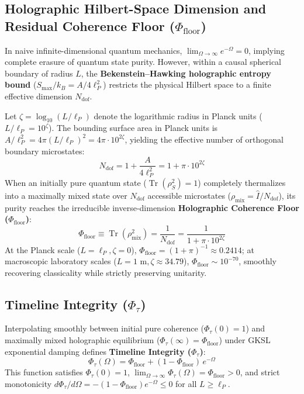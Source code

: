 \documentclass[11pt,a4paper]{article}
\begin{document}
\subsection{Holographic Hilbert-Space Dimension and Residual Coherence Floor ($\Phi_{\mathrm{floor}}$)}
In naive infinite-dimensional quantum mechanics, $\lim_{\Omega \to \infty} e^{-\Omega} = 0$, implying complete erasure of quantum state purity. However, within a causal spherical boundary of radius $L$, the \textbf{Bekenstein--Hawking holographic entropy bound} ($S_{\max} / k_B = A / 4\ell_P^2$) restricts the physical Hilbert space to a finite effective dimension $N_{\mathrm{dof}}$.

Let $\zeta = \log_{10}(L / \ell_P)$ denote the logarithmic radius in Planck units ($L / \ell_P = 10^\zeta$). The bounding surface area in Planck units is $A / \ell_P^2 = 4\pi (L / \ell_P)^2 = 4\pi \cdot 10^{2\zeta}$, yielding the effective number of orthogonal boundary microstates:
\begin{equation}
N_{\mathrm{dof}} = 1 + \frac{A}{4\ell_P^2} = 1 + \pi \cdot 10^{2\zeta}
\end{equation}
When an initially pure quantum state ($\operatorname{Tr}(\rho_S^2) = 1$) completely thermalizes into a maximally mixed state over $N_{\mathrm{dof}}$ accessible microstates ($\rho_{\mathrm{mix}} = \hat{I} / N_{\mathrm{dof}}$), its purity reaches the irreducible inverse-dimension \textbf{Holographic Coherence Floor ($\Phi_{\mathrm{floor}}$)}:
\begin{equation}
\Phi_{\mathrm{floor}} \equiv \operatorname{Tr}(\rho_{\mathrm{mix}}^2) = \frac{1}{N_{\mathrm{dof}}} = \frac{1}{1 + \pi \cdot 10^{2\zeta}}
\end{equation}
At the Planck scale ($L = \ell_P, \zeta = 0$), $\Phi_{\mathrm{floor}} = (1 + \pi)^{-1} \approx 0.2414$; at macroscopic laboratory scales ($L = 1\text{ m}, \zeta \approx 34.79$), $\Phi_{\mathrm{floor}} \sim 10^{-70}$, smoothly recovering classicality while strictly preserving unitarity.

\subsection{Timeline Integrity ($\Phi_\tau$)}
Interpolating smoothly between initial pure coherence ($\Phi_\tau(0) = 1$) and maximally mixed holographic equilibrium ($\Phi_\tau(\infty) = \Phi_{\mathrm{floor}}$) under GKSL exponential damping defines \textbf{Timeline Integrity ($\Phi_\tau$)}:
\begin{equation}
\Phi_\tau(\Omega) = \Phi_{\mathrm{floor}} + (1 - \Phi_{\mathrm{floor}})\,e^{-\Omega}
\end{equation}
This function satisfies $\Phi_\tau(0) = 1$, $\lim_{\Omega \to \infty} \Phi_\tau(\Omega) = \Phi_{\mathrm{floor}} > 0$, and strict monotonicity $d\Phi_\tau / d\Omega = -(1 - \Phi_{\mathrm{floor}})e^{-\Omega} \le 0$ for all $L \ge \ell_P$.
\end{document}
